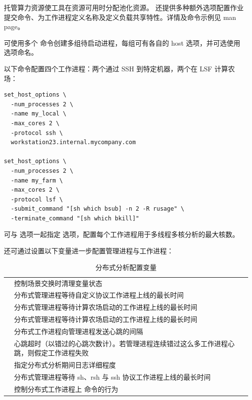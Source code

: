托管算力资源使工具在资源可用时分配池化资源。 还提供多种额外选项配置作业提交命令、为工作进程定义名称及定义负载共享特性。详情及命令示例见  man page。

可使用多个  命令创建多组待启动进程，每组可有各自的 host 选项，并可选使用  选项命名。

以下命令配置四个工作进程：两个通过 SSH 到特定机器，两个在 LSF 计算农场：
\begin{lstlisting}
set_host_options \
  -num_processes 2 \
  -name my_local \
  -max_cores 2 \
  -protocol ssh \
  workstation23.internal.mycompany.com

set_host_options \
  -num_processes 2 \
  -name my_farm \
  -max_cores 2 \
  -protocol lsf \
  -submit_command "[sh which bsub] -n 2 -R rusage" \
  -terminate_command "[sh which bkill]"
\end{lstlisting}

可与 \opt{-num\_processes} 选项一起指定  选项，配置每个工作进程用于多线程多核分析的最大核数。

还可通过设置以下变量进一步配置管理进程与工作进程：

\begin{table}[htbp]
\centering
\caption{分布式分析配置变量}
\small
\begin{tabular}{|L{5.5cm}|L{7.5cm}|}
\hline
{} &  \\
\hline
{} & 控制场景交换时清理变量状态 \\
 & 分布式管理进程等待自定义协议工作进程上线的最长时间 \\
 & 分布式管理进程等待计算农场启动的工作进程上线的最长时间 \\
 & 分布式管理进程等待计算农场启动的工作进程上线的最长时间 \\
 & 分布式工作进程向管理进程发送心跳的间隔 \\
 & 心跳超时（以错过的心跳次数计）。若管理进程连续错过这么多工作进程心跳，则假定工作进程失败 \\
 & 指定分布式分析期间日志详细程度 \\
 & 分布式管理进程等待 sh、rsh 与 ssh 协议工作进程上线的最长时间 \\
 & 控制分布式工作进程上  命令的行为 \\
\hline
\end{tabular}
\end{table}

